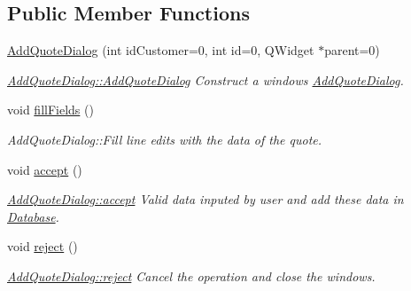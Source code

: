 \subsection*{Public Member Functions}
\begin{DoxyCompactItemize}
\item 
\hyperlink{classGui_1_1Dialogs_1_1AddQuoteDialog_aa2f97eece61cf962621db04d11ea99d7}{Add\+Quote\+Dialog} (int id\+Customer=0, int id=0, Q\+Widget $\ast$parent=0)
\begin{DoxyCompactList}\small\item\em \hyperlink{classGui_1_1Dialogs_1_1AddQuoteDialog_aa2f97eece61cf962621db04d11ea99d7}{Add\+Quote\+Dialog\+::\+Add\+Quote\+Dialog} Construct a windows \hyperlink{classGui_1_1Dialogs_1_1AddQuoteDialog}{Add\+Quote\+Dialog}. \end{DoxyCompactList}\item 
\hypertarget{classGui_1_1Dialogs_1_1AddQuoteDialog_a5dd0cca14b1172a7e1dd9019d8fa8ff3}{void \hyperlink{classGui_1_1Dialogs_1_1AddQuoteDialog_a5dd0cca14b1172a7e1dd9019d8fa8ff3}{fill\+Fields} ()}\label{classGui_1_1Dialogs_1_1AddQuoteDialog_a5dd0cca14b1172a7e1dd9019d8fa8ff3}

\begin{DoxyCompactList}\small\item\em Add\+Quote\+Dialog\+::\+Fill line edits with the data of the quote. \end{DoxyCompactList}\item 
\hypertarget{classGui_1_1Dialogs_1_1AddQuoteDialog_abcc6fc79a513dd1765a4494d9499586b}{void \hyperlink{classGui_1_1Dialogs_1_1AddQuoteDialog_abcc6fc79a513dd1765a4494d9499586b}{accept} ()}\label{classGui_1_1Dialogs_1_1AddQuoteDialog_abcc6fc79a513dd1765a4494d9499586b}

\begin{DoxyCompactList}\small\item\em \hyperlink{classGui_1_1Dialogs_1_1AddQuoteDialog_abcc6fc79a513dd1765a4494d9499586b}{Add\+Quote\+Dialog\+::accept} Valid data inputed by user and add these data in \hyperlink{namespaceDatabase}{Database}. \end{DoxyCompactList}\item 
\hypertarget{classGui_1_1Dialogs_1_1AddQuoteDialog_a1ae935c40fb54142aad3a610a137bd36}{void \hyperlink{classGui_1_1Dialogs_1_1AddQuoteDialog_a1ae935c40fb54142aad3a610a137bd36}{reject} ()}\label{classGui_1_1Dialogs_1_1AddQuoteDialog_a1ae935c40fb54142aad3a610a137bd36}

\begin{DoxyCompactList}\small\item\em \hyperlink{classGui_1_1Dialogs_1_1AddQuoteDialog_a1ae935c40fb54142aad3a610a137bd36}{Add\+Quote\+Dialog\+::reject} Cancel the operation and close the windows. \end{DoxyCompactList}\end{DoxyCompactItemize}


